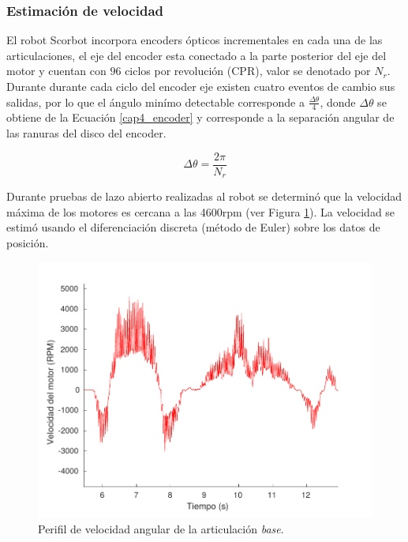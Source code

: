 \subsubsection{Estimación de velocidad}

El robot Scorbot incorpora encoders ópticos incrementales en cada una de las articulaciones, el eje del encoder esta conectado a la parte posterior del eje del motor y cuentan con $96$ ciclos por revolución (CPR), valor se denotado por $N_r$. Durante durante cada ciclo del encoder eje existen cuatro eventos de cambio sus salidas, por lo que el ángulo minímo detectable corresponde a $\frac{\Delta\theta}{4}$, donde $\Delta\theta$ se obtiene de la Ecuación \ref{cap4_encoder} y corresponde a la separación angular de las ranuras del disco del encoder.

\begin{equation}\label{cap4_encoder}
\Delta\theta = \frac{2\pi}{N_r}
\end{equation}

Durante pruebas de lazo abierto realizadas al robot se determinó que la velocidad máxima de los motores es cercana a las \si{4600}{rpm} (ver Figura \ref{cap4_max_velocidad}). La velocidad se estimó usando el diferenciación discreta (método de Euler) sobre los datos de posición.

\begin{figure}[ht]
  \centering
  \includegraphics[scale=0.6]{img/cap4/max_velocidad}
  \caption{Perifil de velocidad angular de la articulación \textit{base}.}
  \label{cap4_max_velocidad}
\end{figure}

